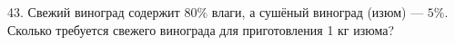43. Свежий виноград содержит $80\%$ влаги, а сушёный виноград (изюм) --- $5\%.$ Сколько требуется свежего винограда для приготовления 1 кг изюма?\\
